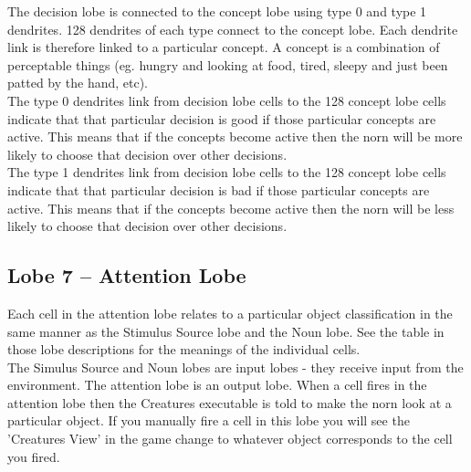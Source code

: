 \documentclass[11pt,twoside,a4paper]{article}
\begin{document}


The decision lobe is connected to the concept lobe using type 0 and type 1 dendrites. 128 dendrites of each type connect to the concept lobe. Each dendrite link is therefore linked to a particular concept. A concept is a combination of perceptable things (eg. hungry and looking at food, tired, sleepy and just been patted by the hand, etc).~\\

The type 0 dendrites link from decision lobe cells to the 128 concept lobe cells indicate that that particular decision is good if those particular concepts are active. This means that if the concepts become active then the norn will be more likely to choose that decision over other decisions.~\\

The type 1 dendrites link from decision lobe cells to the 128 concept lobe cells indicate that that particular decision is bad if those particular concepts are active. This means that if the concepts become active then the norn will be less likely to choose that decision over other decisions.


\subsection{Lobe 7 -- Attention Lobe}

Each cell in the attention lobe relates to a particular object classification in the same manner as the Stimulus Source lobe and the Noun lobe. See the table in those lobe descriptions for the meanings of the individual cells.~\\

The Simulus Source and Noun lobes are input lobes - they receive input from the environment. The attention lobe is an output lobe. When a cell fires in the attention lobe then the Creatures executable is told to make the norn look at a particular object. If you manually fire a cell in this lobe you will see the 'Creatures View' in the game change to whatever object corresponds to the cell you fired.~\\
\end{document}
